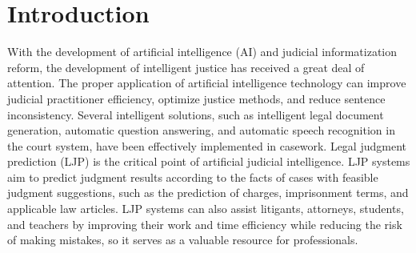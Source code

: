 \documentclass[sn-mathphys,Numbered]{sn-jnl}%
\theoremstyle{thmstyleone}%
\theoremstyle{thmstyletwo}%
\theoremstyle{thmstylethree}%
\begin{document}



\maketitle

\section{Introduction}
\label{sec:introduction}

With the development of artificial intelligence (AI) and judicial informatization reform, the development of intelligent justice has received a great deal of attention. The proper application of artificial intelligence technology can improve judicial practitioner efficiency, optimize justice methods, and reduce sentence inconsistency. Several intelligent solutions, such as intelligent legal document generation, automatic question answering, and automatic speech recognition in the court system, have been effectively implemented in casework. Legal judgment prediction (LJP) is the critical point of artificial judicial intelligence. LJP systems aim to predict judgment results according to the facts of cases with feasible judgment suggestions, such as the prediction of charges, imprisonment terms, and applicable law articles. LJP systems can also assist litigants, attorneys, students, and teachers by improving their work and time efficiency while reducing the risk of making mistakes, so it serves as a valuable resource for professionals.
\end{document}

